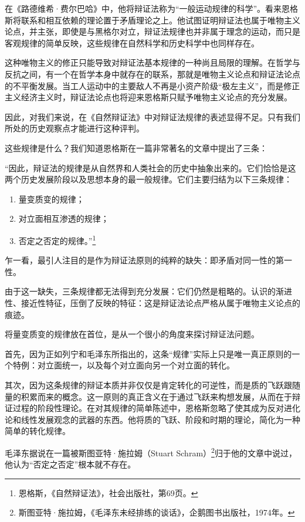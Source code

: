 \documentclass[fontset=fandol, a4paper, 12pt, twoside]{ctexart}
\renewenvironment{quote}
  {\list{}{\rightmargin=0cm \leftmargin=2em}%
   \item\relax\small\kaishu\color{black}}
  {\endlist}
\begin{document}
在《路德维希·费尔巴哈》中，他将辩证法称为“一般运动规律的科学”。看来恩格斯将联系和相互依赖的理论置于矛盾理论之上。他试图证明辩证法也属于唯物主义论点，并主张，即使是与黑格尔对立，辩证法规律也并非属于理念的运动，而只是客观规律的简单反映，这些规律在自然科学和历史科学中也同样存在。

这种唯物主义的修正只能导致对辩证法基本规律的一种尚且局限的理解。在哲学与反抗之间，有一个在哲学本身中就存在的联系，那就是唯物主义论点和辩证法论点的不平衡发展。当工人运动中的主要敌人不再是小资产阶级“极左主义”，而是修正主义经济主义时，辩证法论点也将迎来恩格斯只赋予唯物主义论点的充分发展。

因此，对我们来说，在《自然辩证法》中对辩证法规律的表述显得不足。只有我们所处的历史观察点才能进行这种评判。

这些规律是什么？我们知道恩格斯在一篇非常著名的文章中提出了三条：

\begin{quote}
“因此，辩证法的规律是从自然界和人类社会的历史中抽象出来的。它们恰恰是这两个历史发展阶段以及思想本身的最一般规律。它们主要归结为以下三条规律：
\begin{enumerate}
    \item 量变质变的规律；
    \item 对立面相互渗透的规律；
    \item 否定之否定的规律。”\footnote{恩格斯，《自然辩证法》，社会出版社，第69页。}
\end{enumerate}
\end{quote}

乍一看，最引人注目的是作为辩证法原则的纯粹的缺失：即矛盾对同一性的第一性。

由于这一缺失，三条规律都无法得到充分发展：它们仍然是粗略的。认识的渐进性、接近性特征，压倒了反映的特征：这是辩证法论点严格从属于唯物主义论点的痕迹。

将量变质变的规律放在首位，是从一个很小的角度来探讨辩证法问题。

首先，因为正如列宁和毛泽东所指出的，这条“规律”实际上只是唯一真正原则的一个特例：对立面统一，以及每个对立面向另一个对立面的转化。

其次，因为这条规律的辩证本质并非仅仅是肯定转化的可逆性，而是质的飞跃跟随量的积累而来的概念。这一原则的真正含义在于通过飞跃来构想发展，从而在于辩证过程的阶段性理论。在对其规律的简单陈述中，恩格斯忽略了使其成为反对进化论和线性发展观念的武器的东西。他将质的飞跃、阶段和时期的理论，简化为一种简单的转化规律。

毛泽东据说在一篇被斯图亚特·施拉姆（Stuart Schram）\footnote{斯图亚特·施拉姆，《毛泽东未经排练的谈话》，企鹅图书出版社，1974年。}归于他的文章中说过，他认为“否定之否定”根本就不存在。
\end{document}
